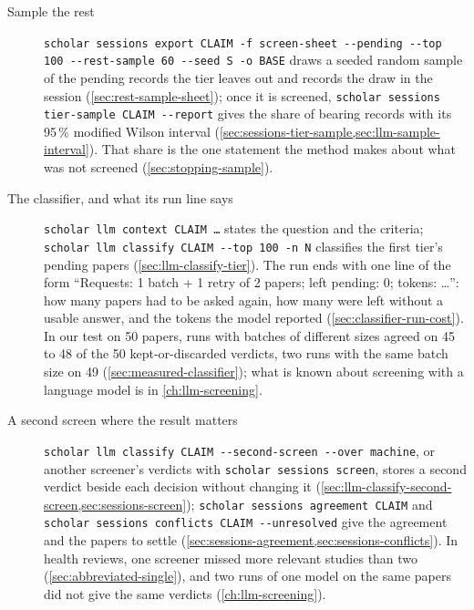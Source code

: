 \begin{description}
\item[Sample the rest]
  \texttt{scholar sessions export CLAIM -f screen-sheet -{}-pending
  -{}-top 100 -{}-rest-sample 60 -{}-seed S -o BASE} draws a seeded random
  sample of the pending records the tier leaves out and records the draw
  in the session (\cref{sec:rest-sample-sheet}); once it is screened,
  \texttt{scholar sessions tier-sample CLAIM -{}-report} gives the share of
  bearing records with its 95\,\% modified Wilson interval
  (\cref{sec:sessions-tier-sample,sec:llm-sample-interval}).
  That share is the one statement the method makes about what was not
  screened (\cref{sec:stopping-sample}).

\item[The classifier, and what its run line says]
  \texttt{scholar llm context CLAIM \textquotesingle{}\dots\textquotesingle{}} states the question and the
  criteria; \texttt{scholar llm classify CLAIM -{}-top 100 -n N} classifies
  the first tier's pending papers (\cref{sec:llm-classify-tier}).
  The run ends with one line of the form \enquote{Requests: 1 batch + 1
  retry of 2 papers; left pending: 0; tokens: \dots}: how many
  papers had to be asked again, how many were left without a usable
  answer, and the tokens the model reported (\cref{sec:classifier-run-cost}).
  In our test on 50 papers, runs with batches of different sizes agreed
  on 45 to 48 of the 50 kept-or-discarded verdicts, two runs with the
  same batch size on 49 (\cref{sec:measured-classifier}); what is known
  about screening with a
  language model is in \cref{ch:llm-screening}.

\item[A second screen where the result matters]
  \texttt{scholar llm classify CLAIM -{}-second-screen -{}-over machine}, or
  another screener's verdicts with \texttt{scholar sessions screen},
  stores a second verdict beside each decision without changing it
  (\cref{sec:llm-classify-second-screen,sec:sessions-screen});
  \texttt{scholar sessions agreement CLAIM} and \texttt{scholar sessions
  conflicts CLAIM -{}-unresolved} give the agreement and the papers to
  settle (\cref{sec:sessions-agreement,sec:sessions-conflicts}).
  In health reviews, one screener missed more relevant studies than two
  (\cref{sec:abbreviated-single}), and two runs of one model on the same
  papers did not give the same verdicts (\cref{ch:llm-screening}).


\end{description}
